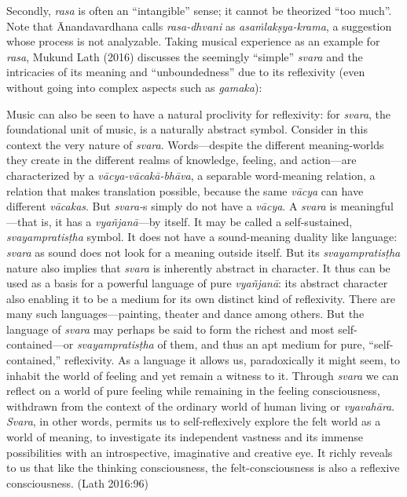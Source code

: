 Secondly, \textsl{rasa} is often an “intangible” sense; it cannot be theorized “too much”. Note that Ānandavardhana calls \textsl{rasa-dhvani}
 as \textsl{asaṁlakṣya-krama}, a suggestion whose process is not analyzable. Taking musical experience as an example for \textsl{rasa}, Mukund Lath (2016) discusses the seemingly “simple” \textsl{svara} and the intricacies of its meaning and “unboundedness” due to its reflexivity (even without going into complex aspects such as \textsl{gamaka}):

\begin{myquote}
Music can also be seen to have a natural proclivity for reflexivity: for \textsl{svara}, the foundational unit of music, is a naturally abstract symbol. Consider in this context the very nature of \textsl{svara}. Words—despite the different meaning-worlds they create in the different realms of knowledge, feeling, and action—are characterized by a \textsl{vācya-vācakā-bhāva}, a separable word-meaning relation, a relation that makes translation possible, because the same \textsl{vācya} can have different \textsl{vācakas}. But \textsl{svara-}s simply do not have a \textsl{vācya}. A \textsl{svara} is meaningful—that is, it has a \textsl{vyañjanā}---by itself. It may be called a self-sustained, \textsl{svayampratisṭha} symbol. It does not have a sound-meaning duality like language: \textsl{svara} as sound does not look for a meaning outside itself. But its \textsl{svayampratisṭha} nature also implies that \textsl{svara} is inherently abstract in character. It thus can be used as a basis for a powerful language of pure \textsl{vyañjanā}: its abstract character also enabling it to be a medium for its own distinct kind of reflexivity. There are many such languages—painting, theater and dance among others. But the language of \textsl{svara} may perhaps be said to form the richest and most self-contained—or \textsl{svayampratisṭha} of them, and thus an apt medium for pure, “self-contained,” reflexivity. As a language it allows us, paradoxically it might seem, to inhabit the world of feeling and yet remain a witness to it. Through \textsl{svara} we can reflect on a world of pure feeling while remaining in the feeling consciousness, withdrawn from the context of the ordinary world of human living or \textsl{vyavahāra}. \textsl{Svara}, in other words, permits us to self-reflexively explore the felt world as a world of meaning, to investigate its independent vastness and its immense possibilities with an introspective, imaginative and creative eye. It richly reveals to us that like the thinking consciousness, the felt-consciousness is also a reflexive consciousness. 
\hfill(Lath 2016:96)
\end{myquote}

